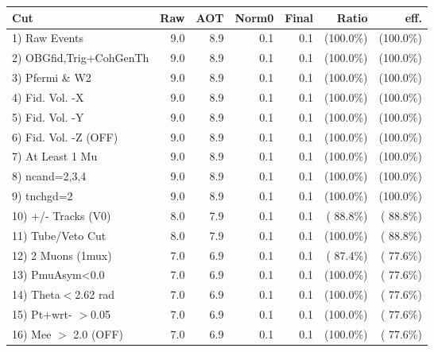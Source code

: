  \begin{table}[h!]\centering
 \begin{tabular}{||l||r|r|r|r|r|r||}
 \hline
 \hline
 Cut & Raw & AOT & Norm0 & Final & Ratio & eff.       \\
 \hline
  1) Raw Events           &          9.0 &          8.9 &          0.1 &          0.1 & (100.0\%) & (100.0\%) \\
  2) OBGfid,Trig+CohGenTh &          9.0 &          8.9 &          0.1 &          0.1 & (100.0\%) & (100.0\%) \\
  3) Pfermi \& W2         &          9.0 &          8.9 &          0.1 &          0.1 & (100.0\%) & (100.0\%) \\
  4) Fid. Vol. -X         &          9.0 &          8.9 &          0.1 &          0.1 & (100.0\%) & (100.0\%) \\
  5) Fid. Vol. -Y         &          9.0 &          8.9 &          0.1 &          0.1 & (100.0\%) & (100.0\%) \\
  6) Fid. Vol. -Z (OFF)   &          9.0 &          8.9 &          0.1 &          0.1 & (100.0\%) & (100.0\%) \\
  7) At Least 1 Mu        &          9.0 &          8.9 &          0.1 &          0.1 & (100.0\%) & (100.0\%) \\
  8) ncand=2,3,4          &          9.0 &          8.9 &          0.1 &          0.1 & (100.0\%) & (100.0\%) \\
  9) tnchgd=2             &          9.0 &          8.9 &          0.1 &          0.1 & (100.0\%) & (100.0\%) \\
 10) +/- Tracks (V0)      &          8.0 &          7.9 &          0.1 &          0.1 & ( 88.8\%) & ( 88.8\%) \\
 11) Tube/Veto Cut        &          8.0 &          7.9 &          0.1 &          0.1 & (100.0\%) & ( 88.8\%) \\
 12) 2 Muons (1mux)       &          7.0 &          6.9 &          0.1 &          0.1 & ( 87.4\%) & ( 77.6\%) \\
 13) PmuAsym<0.0          &          7.0 &          6.9 &          0.1 &          0.1 & (100.0\%) & ( 77.6\%) \\
 14) Theta$<$2.62 rad     &          7.0 &          6.9 &          0.1 &          0.1 & (100.0\%) & ( 77.6\%) \\
 15) Pt+wrt- $>$0.05      &          7.0 &          6.9 &          0.1 &          0.1 & (100.0\%) & ( 77.6\%) \\
 16) Mee $>$ 2.0  (OFF)   &          7.0 &          6.9 &          0.1 &          0.1 & (100.0\%) & ( 77.6\%) \\

\end{tabular}
\end{table}
